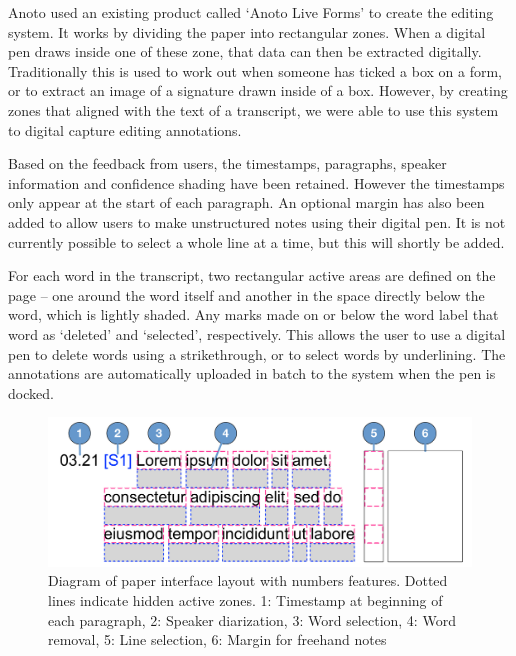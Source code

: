 Anoto used an existing product called `Anoto Live Forms' to create the editing system. It works by dividing the paper
into rectangular zones. When a digital pen draws inside one of these zone, that data can then be extracted digitally.
Traditionally this is used to work out when someone has ticked a box on a form, or to extract an image of a signature
drawn inside of a box. However, by creating zones that aligned with the text of a transcript, we were able to use this
system to digital capture editing annotations.

Based on the feedback from users, the timestamps, paragraphs, speaker information and confidence shading have been
retained. However the timestamps only appear at the start of each paragraph. An optional margin has also been added to
allow users to make unstructured notes using their digital pen.  It is not currently possible to select a whole line at
a time, but this will shortly be added.

For each word in the transcript, two rectangular active areas are defined on the page -- one around the word itself and
another in the space directly below the word, which is lightly shaded. Any marks made on or below the word label that
word as `deleted' and `selected', respectively. This allows the user to use a digital pen to delete words using a
strikethrough, or to select words by underlining.  The annotations are automatically uploaded in batch to the system
when the pen is docked.

\begin{figure}[h]
  \centering
  \includegraphics[width=\columnwidth]{figs/paper-interface-diagram.pdf}
  \caption{Diagram of paper interface layout with numbers features. Dotted lines indicate hidden active zones. 1:
    Timestamp at beginning of each paragraph, 2: Speaker diarization, 3: Word selection, 4: Word removal, 5: Line
    selection, 6: Margin for freehand notes}
  \label{fig:paper-interface-diagram}
\end{figure}

